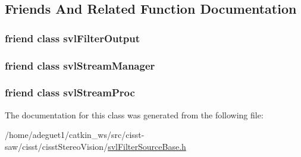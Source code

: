 \subsection{Friends And Related Function Documentation}
\hypertarget{classsvl_filter_source_base_a3f45c3511fc124d190c8ffb5953025f6}{
\subsubsection[{svl\-Filter\-Output}]{\setlength{\rightskip}{0pt plus 5cm}friend class {\bf svl\-Filter\-Output}\hspace{0.3cm}{\ttfamily [friend]}}}\label{classsvl_filter_source_base_a3f45c3511fc124d190c8ffb5953025f6}
\hypertarget{classsvl_filter_source_base_ab5eee58544f2ce644140e932afbe32db}{
\subsubsection[{svl\-Stream\-Manager}]{\setlength{\rightskip}{0pt plus 5cm}friend class {\bf svl\-Stream\-Manager}\hspace{0.3cm}{\ttfamily [friend]}}}\label{classsvl_filter_source_base_ab5eee58544f2ce644140e932afbe32db}
\hypertarget{classsvl_filter_source_base_a6a9ee1dec5ca263793dca09411295245}{
\subsubsection[{svl\-Stream\-Proc}]{\setlength{\rightskip}{0pt plus 5cm}friend class {\bf svl\-Stream\-Proc}\hspace{0.3cm}{\ttfamily [friend]}}}\label{classsvl_filter_source_base_a6a9ee1dec5ca263793dca09411295245}


The documentation for this class was generated from the following file\-:\begin{DoxyCompactItemize}
\item 
/home/adeguet1/catkin\-\_\-ws/src/cisst-\/saw/cisst/cisst\-Stereo\-Vision/\hyperlink{svl_filter_source_base_8h}{svl\-Filter\-Source\-Base.\-h}\end{DoxyCompactItemize}

